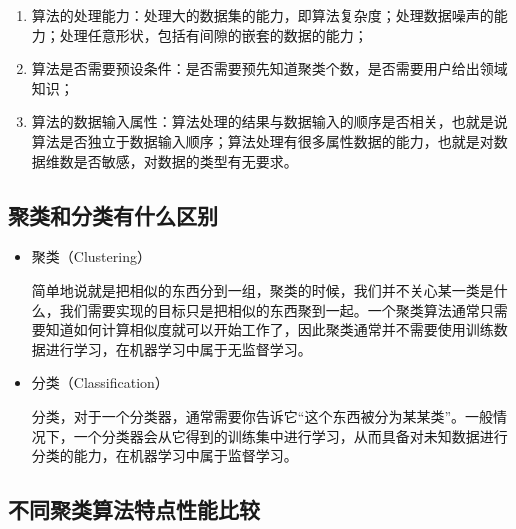 \begin{enumerate}\itemsep0em
		\item 算法的处理能力：处理大的数据集的能力，即算法复杂度；处理数据噪声的能力；处理任意形状，包括有间隙的嵌套的数据的能力；
		\item 算法是否需要预设条件：是否需要预先知道聚类个数，是否需要用户给出领域知识；
		\item 算法的数据输入属性：算法处理的结果与数据输入的顺序是否相关，也就是说算法是否独立于数据输入顺序；算法处理有很多属性数据的能力，也就是对数据维数是否敏感，对数据的类型有无要求。
\end{enumerate}

\subsection{聚类和分类有什么区别}

\begin{itemize}\itemsep0em
\item 聚类（Clustering）

简单地说就是把相似的东西分到一组，聚类的时候，我们并不关心某一类是什么，我们需要实现的目标只是把相似的东西聚到一起。一个聚类算法通常只需要知道如何计算相似度就可以开始工作了，因此聚类通常并不需要使用训练数据进行学习，在机器学习中属于无监督学习。

\item 分类（Classification）

分类，对于一个分类器，通常需要你告诉它``这个东西被分为某某类''。一般情况下，一个分类器会从它得到的训练集中进行学习，从而具备对未知数据进行分类的能力，在机器学习中属于监督学习。
\end{itemize}


\subsection{不同聚类算法特点性能比较}

